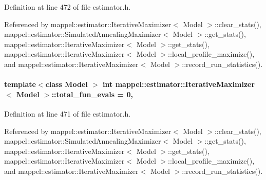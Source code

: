 Definition at line 472 of file estimator.\+h.



Referenced by mappel\+::estimator\+::\+Iterative\+Maximizer$<$ Model $>$\+::clear\+\_\+stats(), mappel\+::estimator\+::\+Simulated\+Annealing\+Maximizer$<$ Model $>$\+::get\+\_\+stats(), mappel\+::estimator\+::\+Iterative\+Maximizer$<$ Model $>$\+::get\+\_\+stats(), mappel\+::estimator\+::\+Iterative\+Maximizer$<$ Model $>$\+::local\+\_\+profile\+\_\+maximize(), and mappel\+::estimator\+::\+Iterative\+Maximizer$<$ Model $>$\+::record\+\_\+run\+\_\+statistics().

\paragraph[{\texorpdfstring{total\+\_\+fun\+\_\+evals}{total_fun_evals}}]{\setlength{\rightskip}{0pt plus 5cm}template$<$class Model $>$ int {\bf mappel\+::estimator\+::\+Iterative\+Maximizer}$<$ Model $>$\+::total\+\_\+fun\+\_\+evals = 0\hspace{0.3cm}{\ttfamily [protected]}, {\ttfamily [inherited]}}\hypertarget{classmappel_1_1estimator_1_1IterativeMaximizer_aa4f49112ff3b145fa1096a7ac4d48af7}{}\label{classmappel_1_1estimator_1_1IterativeMaximizer_aa4f49112ff3b145fa1096a7ac4d48af7}


Definition at line 471 of file estimator.\+h.



Referenced by mappel\+::estimator\+::\+Iterative\+Maximizer$<$ Model $>$\+::clear\+\_\+stats(), mappel\+::estimator\+::\+Simulated\+Annealing\+Maximizer$<$ Model $>$\+::get\+\_\+stats(), mappel\+::estimator\+::\+Iterative\+Maximizer$<$ Model $>$\+::get\+\_\+stats(), mappel\+::estimator\+::\+Iterative\+Maximizer$<$ Model $>$\+::local\+\_\+profile\+\_\+maximize(), and mappel\+::estimator\+::\+Iterative\+Maximizer$<$ Model $>$\+::record\+\_\+run\+\_\+statistics().

